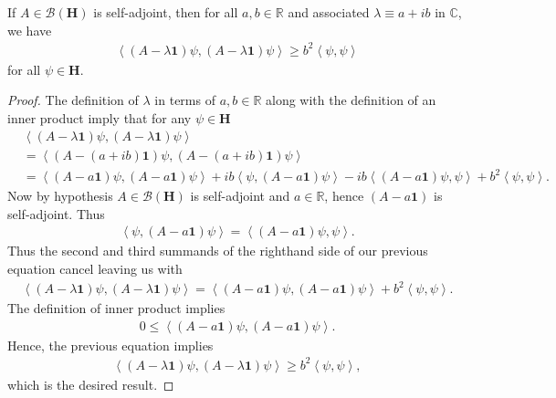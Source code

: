 \begin{lemma}
    \label{lmm:hall-7.8}
    \leanok
    If $A \in \mathcal{B}(\mathbf{H})$ is self-adjoint, then for all $a,b \in \mathbb{R}$ and associated $\lambda \equiv a + ib$ in $\mathbb{C}$, we have
    \begin{align}
        \left< (A - \lambda \mathbf{1}) \psi, (A - \lambda \mathbf{1}) \psi \right> \ge b^2 \left< \psi, \psi \right>
    \end{align}
    for all $\psi \in \mathbf{H}$.
\end{lemma}
\begin{proof}
    \leanok
The definition of $\lambda$ in terms of $a,b \in \mathbb{R}$ along with the definition of an inner product imply that for any $\psi \in \mathbf{H}$
\begin{align}
    &\left< (A - \lambda \mathbf{1}) \psi, (A - \lambda \mathbf{1}) \psi \right> \\
    &= \left< (A - (a + ib) \mathbf{1}) \psi, (A - (a + ib) \mathbf{1}) \psi \right> \\
    &= \left< (A - a\mathbf{1}) \psi, (A - a\mathbf{1}) \psi \right> + ib \left< \psi, (A - a\mathbf{1}) \psi \right> - ib \left< (A - a\mathbf{1}) \psi, \psi \right> + b^2 \left< \psi, \psi \right>.
\end{align}
Now by hypothesis $A \in \mathcal{B}(\mathbf{H})$ is self-adjoint and $a \in \mathbb{R}$, hence $(A - a\mathbf{1})$ is self-adjoint. Thus
\begin{align}
    \left< \psi, (A - a\mathbf{1}) \psi \right> = \left< (A - a\mathbf{1}) \psi, \psi \right>.
\end{align}
Thus the second and third summands of the righthand side of our previous equation cancel leaving us with
\begin{align}
    \left< (A - \lambda \mathbf{1}) \psi, (A - \lambda \mathbf{1}) \psi \right> = \left< (A - a\mathbf{1}) \psi, (A - a\mathbf{1}) \psi \right> + b^2 \left< \psi, \psi \right>.
\end{align}
The definition of inner product implies
\begin{align}
    0 \le \left< (A - a\mathbf{1}) \psi, (A - a\mathbf{1}) \psi \right>.
\end{align}
Hence, the previous equation implies
\begin{align}
    \left< (A - \lambda \mathbf{1}) \psi, (A - \lambda \mathbf{1}) \psi \right> \ge b^2 \left< \psi, \psi \right>,
\end{align}
which is the desired result.
\end{proof}

